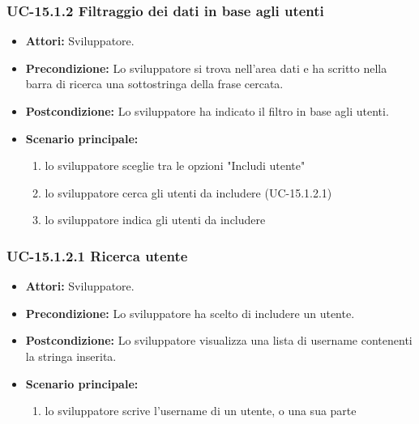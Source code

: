 	\subsubsection{UC-15.1.2 Filtraggio dei dati in base agli utenti}	
		\begin{itemize}
			\item \textbf{Attori:} Sviluppatore.
			\item \textbf{Precondizione:} Lo sviluppatore si trova nell'area dati e ha scritto nella barra di ricerca una sottostringa della frase cercata.
			\item \textbf{Postcondizione:} Lo sviluppatore ha indicato il filtro in base agli utenti.
			\item \textbf{Scenario principale:}
				\begin{enumerate}
					\item lo sviluppatore sceglie tra le opzioni "Includi utente"
					\item lo sviluppatore cerca gli utenti da includere (UC-15.1.2.1)
					\item lo sviluppatore indica gli utenti da includere
				\end{enumerate}
		\end{itemize}
		
	\subsubsection{UC-15.1.2.1 Ricerca utente}
		\begin{itemize}
			\item \textbf{Attori:} Sviluppatore.
			\item \textbf{Precondizione:} Lo sviluppatore ha scelto di includere un utente.
			\item \textbf{Postcondizione:} Lo sviluppatore visualizza una lista di username contenenti la stringa inserita.
			\item \textbf{Scenario principale:}
			\begin{enumerate}
				\item lo sviluppatore scrive l'username di un utente, o una sua parte
			\end{enumerate}
		\end{itemize}		
			
